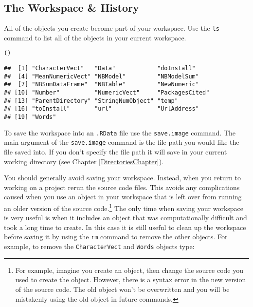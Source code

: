 {\subsection{The Workspace \& History}

All of the objects you create become part of your workspace. Use the \texttt{ls} command to list all of the objects in your current workspace.

\begin{knitrout}
\color{fgcolor}\begin{kframe}
\begin{alltt}
()
\end{alltt}
\begin{verbatim}
##  [1] "CharacterVect"   "Data"            "doInstall"      
##  [4] "MeanNumericVect" "NBModel"         "NBModelSum"     
##  [7] "NBSumDataFrame"  "NBTable"         "NewNumeric"     
## [10] "Number"          "NumericVect"     "PackagesCited"  
## [13] "ParentDirectory" "StringNumObject" "temp"           
## [16] "toInstall"       "url"             "UrlAddress"     
## [19] "Words"
\end{verbatim}
\end{kframe}
\end{knitrout}


To save the workspace into an \texttt{.RData} file use the \texttt{save.image} command. The main argument of the \texttt{save.image} command is the file path you would like the file saved into. If you don't specify the file path it will save in your current working directory (see Chapter \ref{DirectoriesChapter}). 

You should generally avoid saving your workspace. Instead, when you return to working on a project rerun the source code files. This avoids any complications caused when you use an object in your workspace that is left over from running an older version of the source code.\footnote{For example, imagine you create an object, then change the source code you used to create the object. However, there is a syntax error in the new version of the source code. The old object won't be overwritten and you will be mistakenly using the old object in future commands.} The only time when saving your workspace is very useful is when it includes an object that was computationally difficult and took a long time to create. In this case it is still useful to clean up the workspace before saving it by using the \texttt{rm} command to remove the other objects. For example, to remove the \texttt{CharacterVect} and \texttt{Words} objects type:

}
